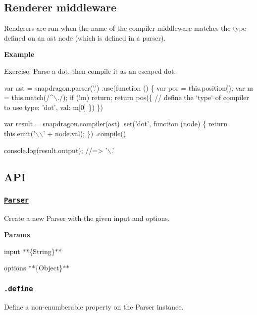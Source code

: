 \subsection*{Renderer middleware}

Renderers are run when the name of the compiler middleware matches the {\ttfamily type} defined on an ast {\ttfamily node} (which is defined in a parser).

{\bfseries Example}

Exercise\+: Parse a dot, then compile it as an escaped dot.


\begin{DoxyCode}
var ast = snapdragon.parser('.')
  .use(function () \{
    var pos = this.position();
    var m = this.match(/^\(\backslash\)./);
    if (!m) return;
    return pos(\{
      // define the `type` of compiler to use
      type: 'dot',
      val: m[0]
    \})
  \})

var result = snapdragon.compiler(ast)
  .set('dot', function (node) \{
    return this.emit('\(\backslash\)\(\backslash\)' + node.val);
  \})
  .compile()

console.log(result.output);
//=> '\(\backslash\).'
\end{DoxyCode}


\subsection*{A\+PI}

\subsubsection*{\href{lib/parser.js#L19}{\tt Parser}}

Create a new {\ttfamily Parser} with the given {\ttfamily input} and {\ttfamily options}.

{\bfseries Params}


\begin{DoxyItemize}
\item {\ttfamily input} $\ast$$\ast$\{String\}$\ast$$\ast$
\item {\ttfamily options} $\ast$$\ast$\{Object\}$\ast$$\ast$
\end{DoxyItemize}

\subsubsection*{\href{lib/parser.js#L103}{\tt .define}}

Define a non-\/enumberable property on the {\ttfamily Parser} instance.

